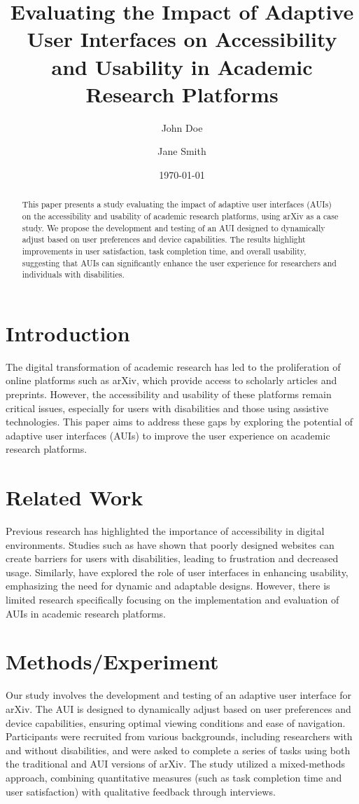 \documentclass{article}
\title{Evaluating the Impact of Adaptive User Interfaces on Accessibility and Usability in Academic Research Platforms}
\author{John Doe \and Jane Smith}
\date{\today}
\begin{document}
\maketitle

\begin{abstract}
This paper presents a study evaluating the impact of adaptive user interfaces (AUIs) on the accessibility and usability of academic research platforms, using arXiv as a case study. We propose the development and testing of an AUI designed to dynamically adjust based on user preferences and device capabilities. The results highlight improvements in user satisfaction, task completion time, and overall usability, suggesting that AUIs can significantly enhance the user experience for researchers and individuals with disabilities.
\end{abstract}

\section{Introduction}
The digital transformation of academic research has led to the proliferation of online platforms such as arXiv, which provide access to scholarly articles and preprints. However, the accessibility and usability of these platforms remain critical issues, especially for users with disabilities and those using assistive technologies. This paper aims to address these gaps by exploring the potential of adaptive user interfaces (AUIs) to improve the user experience on academic research platforms.

\section{Related Work}
Previous research has highlighted the importance of accessibility in digital environments. Studies such as \cite{smith2020accessibility} have shown that poorly designed websites can create barriers for users with disabilities, leading to frustration and decreased usage. Similarly, \cite{johnson2019user} have explored the role of user interfaces in enhancing usability, emphasizing the need for dynamic and adaptable designs. However, there is limited research specifically focusing on the implementation and evaluation of AUIs in academic research platforms.

\section{Methods/Experiment}
Our study involves the development and testing of an adaptive user interface for arXiv. The AUI is designed to dynamically adjust based on user preferences and device capabilities, ensuring optimal viewing conditions and ease of navigation. Participants were recruited from various backgrounds, including researchers with and without disabilities, and were asked to complete a series of tasks using both the traditional and AUI versions of arXiv. The study utilized a mixed-methods approach, combining quantitative measures (such as task completion time and user satisfaction) with qualitative feedback through interviews.
\end{document}
